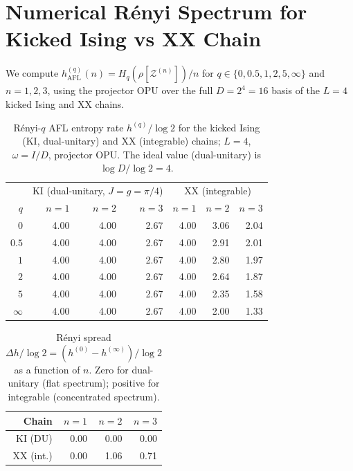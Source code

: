 \documentclass[12pt,a4paper]{article}
\begin{document}
\section{Numerical R\'enyi Spectrum for Kicked Ising vs XX Chain}
\label{sec:renyi_numerics}

We compute $h_{\mathrm{AFL}}^{(q)}(n) = H_q(\rho[\mathcal{Z}^{(n)}])/n$
for $q \in \{0, 0.5, 1, 2, 5, \infty\}$ and $n = 1, 2, 3$,
using the projector OPU over the full $D = 2^4 = 16$ basis of the
$L=4$ kicked Ising and XX chains.

\begin{table}[h!]
\centering
\caption{R\'enyi-$q$ AFL entropy rate $h^{(q)}/\log 2$
for the kicked Ising (KI, dual-unitary) and XX (integrable) chains;
$L=4$, $\omega = I/D$, projector OPU.
The ideal value (dual-unitary) is $\log D/\log 2 = 4$.}
\label{tab:renyi_spectrum}
\begin{tabular}{r|rrr|rrr}
\hline
& \multicolumn{3}{c|}{KI (dual-unitary, $J=g=\pi/4$)}
& \multicolumn{3}{c}{XX (integrable)} \\
$q$ & $n=1$ & $n=2$ & $n=3$ & $n=1$ & $n=2$ & $n=3$ \\
\hline
$0$       & 4.00 & 4.00 & 2.67 & 4.00 & 3.06 & 2.04 \\
$0.5$     & 4.00 & 4.00 & 2.67 & 4.00 & 2.91 & 2.01 \\
$1$       & 4.00 & 4.00 & 2.67 & 4.00 & 2.80 & 1.97 \\
$2$       & 4.00 & 4.00 & 2.67 & 4.00 & 2.64 & 1.87 \\
$5$       & 4.00 & 4.00 & 2.67 & 4.00 & 2.35 & 1.58 \\
$\infty$  & 4.00 & 4.00 & 2.67 & 4.00 & 2.00 & 1.33 \\
\hline
\end{tabular}
\end{table}

\begin{table}[h!]
\centering
\caption{R\'enyi spread $\Delta h/\log 2 = (h^{(0)}-h^{(\infty)})/\log 2$
as a function of $n$.  Zero for dual-unitary (flat spectrum);
positive for integrable (concentrated spectrum).}
\label{tab:renyi_spread}
\begin{tabular}{r|rrr}
\hline
Chain & $n=1$ & $n=2$ & $n=3$ \\
\hline
KI (DU)   & 0.00 & 0.00 & 0.00 \\
XX (int.) & 0.00 & 1.06 & 0.71 \\
\hline
\end{tabular}
\end{table}
\end{document}
